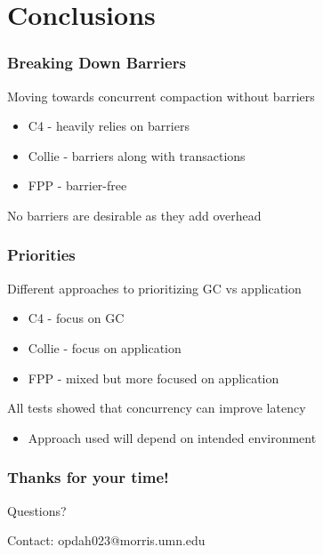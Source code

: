 \documentclass{beamer}
\newcommand{\linespace}{\vskip 0.25cm}
\begin{document}
\section[Conclusions]{Conclusions}

\begin{frame}

\frametitle{Breaking Down Barriers}

Moving towards concurrent compaction without barriers
\begin{itemize}
\item C4 - heavily relies on barriers
\item Collie - barriers along with transactions
\item FPP - barrier-free
\end{itemize}

\linespace
\linespace

No barriers are desirable as they add overhead

\end{frame}

\begin{frame}

\frametitle{Priorities}

Different approaches to prioritizing GC vs application
\begin{itemize}
\item C4 - focus on GC
\item Collie - focus on application
\item FPP - mixed but more focused on application
\end{itemize}

\linespace
\linespace

All tests showed that concurrency can improve latency
\begin{itemize}
\item Approach used will depend on intended environment
\end{itemize}

\end{frame}

\begin{frame}
	\frametitle{Thanks for your time!}
	
	\begin{center}
	{\huge Questions?}
	\end{center}	
	
	\linespace
	\linespace	
	
	\begin{center}
	Contact: opdah023@morris.umn.edu
	\end{center}
	
\end{frame}
\end{document}
